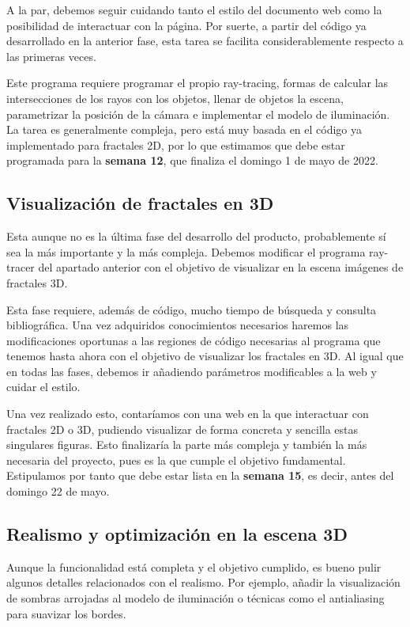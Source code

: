 A la par, debemos seguir cuidando tanto el estilo del documento web como la posibilidad de interactuar con la página. Por suerte, a partir del código ya desarrollado en la anterior fase, esta tarea se facilita considerablemente respecto a las primeras veces.

Este programa requiere programar el propio ray-tracing, formas de calcular las intersecciones de los rayos con los objetos, llenar de objetos la escena, parametrizar la posición de la cámara e implementar el modelo de iluminación. La tarea es generalmente compleja, pero está muy basada en el código ya implementado para fractales 2D, por lo que estimamos que debe estar programada para la \textbf{semana 12}, que finaliza el domingo 1 de mayo de 2022.

\subsection{Visualización de fractales en 3D}

Esta aunque no es la última fase del desarrollo del producto, probablemente sí sea la más importante y la más compleja. Debemos modificar el programa ray-tracer del apartado anterior con el objetivo de visualizar en la escena imágenes de fractales 3D.

Esta fase requiere, además de código, mucho tiempo de búsqueda y consulta bibliográfica. Una vez adquiridos conocimientos necesarios haremos las modificaciones oportunas a las regiones de código necesarias al programa que tenemos hasta ahora con el objetivo de visualizar los fractales en 3D.
Al igual que en todas las fases, debemos ir añadiendo parámetros modificables a la web y cuidar el estilo.

Una vez realizado esto, contaríamos con una web en la que interactuar con fractales 2D o 3D, pudiendo visualizar de forma concreta y sencilla estas singulares figuras. Esto finalizaría la parte más compleja y también la más necesaria del proyecto, pues es la que cumple el objetivo fundamental. Estipulamos por tanto que debe estar lista en la \textbf{semana 15}, es decir, antes del domingo 22 de mayo.

\subsection{Realismo y optimización en la escena 3D}

Aunque la funcionalidad está completa y el objetivo cumplido, es bueno pulir algunos detalles relacionados con el realismo. Por ejemplo, añadir la visualización de sombras arrojadas al modelo de iluminación o técnicas como el antialiasing para suavizar los bordes.

